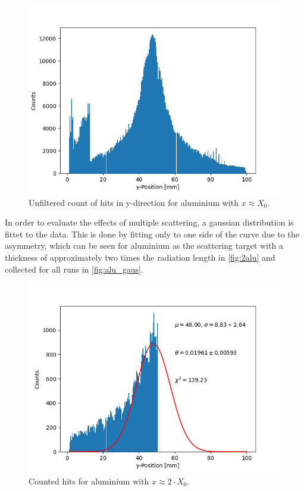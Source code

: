 \documentclass[sn-mathphys-num,iicol]{sn-jnl}
\theoremstyle{thmstyleone}
\theoremstyle{thmstyletwo}
\theoremstyle{thmstylethree}
\begin{document}
\begin{figure}
  \includegraphics[width=.9\linewidth]{../src/elsa/finished_plots/unmirroredAluminium, One Radiation Length, 40cm Distance.png}
  \caption{Unfiltered count of hits in y-direction for aluminium with $x\approx X_0$.}
  \label{fig:shit_plot}
\end{figure}

In order to evaluate the effects of multiple scattering, a gaussian distribution is fittet to the data. 
This is done by fitting only to one side of the curve due to the asymmetry, which can be seen for aluminium as the scattering target with a thickness of approximately two times the radiation length in \autoref{fig:2alu} and collected for all runs in \autoref{fig:alu_gaus}.

\begin{figure}
  \includegraphics[width=0.9\linewidth]{../src/elsa/finished_plots/Aluminium, Two Radiation Lengths, 40cm Distance.png}
  \caption{Counted hits for aluminium with $x\approx2\cdot X_0$.}
  \label{fig:2alu}
\end{figure}
\end{document}
